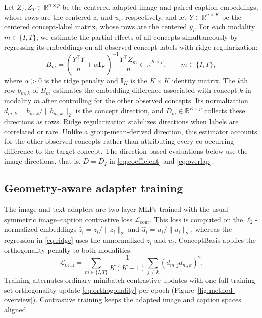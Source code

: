 \documentclass[mlmain,onecolumn]{jmlr}
\begin{document}
Let $Z_I,Z_T \in \mathbb{R}^{n\times p}$ be the centered adapted image and paired-caption embeddings, whose rows are the centered $z_i$ and $u_i$, respectively, and let $Y \in \mathbb{R}^{n\times K}$ be the centered concept-label matrix, whose rows are the centered $y_i$. For each modality $m\in\{I,T\}$, we estimate the partial effects of all concepts simultaneously by regressing its embeddings on all observed concept labels with ridge regularization:
\begin{equation}
  B_m=\left(\frac{Y^\top Y}{n}+\alpha \mathbf{I}_K\right)^{-1}
  \frac{Y^\top Z_m}{n}\in\mathbb{R}^{K\times p},
  \qquad m\in\{I,T\},
  \label{eq:ridge}
\end{equation}
where $\alpha>0$ is the ridge penalty and $\mathbf{I}_K$ is the $K\times K$ identity matrix. The $k$th row $b_{m,k}$ of $B_m$ estimates the embedding difference associated with concept $k$ in modality $m$ after controlling for the other observed concepts. Its normalization $d_{m,k}=b_{m,k}/\lVert b_{m,k}\rVert_2$ is the concept direction, and $D_m\in\mathbb{R}^{K\times p}$ collects these directions as rows. Ridge regularization stabilizes directions when labels are correlated or rare. Unlike a group-mean-derived direction, this estimator accounts for the other observed concepts rather than attributing every co-occurring difference to the target concept. The direction-based evaluations below use the image directions, that is, $D=D_I$ in \eqref{eq:coefficient} and \eqref{eq:overlap}.

\subsection{Geometry-aware adapter training}

The image and text adapters are two-layer MLPs trained with the usual symmetric image--caption contrastive loss $\mathcal{L}_{\mathrm{cont}}$. This loss is computed on the $\ell_2$-normalized embeddings $\hat z_i=z_i/\lVert z_i\rVert_2$ and $\hat u_i=u_i/\lVert u_i\rVert_2$, whereas the regression in \eqref{eq:ridge} uses the unnormalized $z_i$ and $u_i$. ConceptBasis applies the orthogonality penalty to both modalities:
\begin{equation}
  \mathcal{L}_{\mathrm{orth}}=
  \sum_{m\in\{I,T\}}
  \frac{1}{K(K-1)}
  \sum_{j\neq k}(d_{m,j}^\top d_{m,k})^2.
  \label{eq:orthogonality}
\end{equation}
Training alternates ordinary minibatch contrastive updates with one full-training-set orthogonality update \eqref{eq:orthogonality} per epoch (Figure~\ref{fig:method-overview}). Contrastive training keeps the adapted image and caption spaces aligned.
\end{document}
